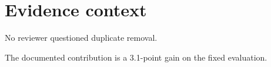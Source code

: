 \section{Evidence context}
No reviewer questioned duplicate removal.

The documented contribution is a 3.1-point gain on the fixed evaluation.
